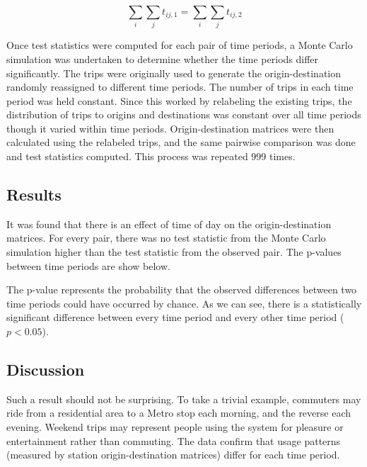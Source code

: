 \documentclass[letterpaper,11pt]{article}
\begin{document}
\begin{equation}\label{eq:timeconstraint}
  \displaystyle \sum_i \sum_j t_{ij,1} = \sum_i \sum_j t_{ij,2}
\end{equation}

Once test statistics were computed for each pair of time periods, a
Monte Carlo simulation was undertaken to determine whether the time
periods differ significantly. The trips were originally used to
generate the origin-destination randomly reassigned to different time
periods. The number of trips in each time period was held
constant. Since this worked by relabeling the existing trips, the
distribution of trips to origins and destinations was constant over
all time periods though it varied within time
periods. Origin-destination matrices were then calculated using the
relabeled trips, and the same pairwise comparison was done and test
statistics computed. This process was repeated 999 times.

\subsection{Results}

It was found that there is an effect of time of day on the
origin-destination matrices. For every pair, there was no test
statistic from the Monte Carlo simulation higher than the test statistic
from the observed pair. The p-values between time periods are show below.

\noindent 

The p-value represents the probability that the observed differences
between two time periods could have occurred by chance. As we can see,
there is a statistically significant difference between every time
period and every other time period ($p < 0.05$).

\subsection{Discussion}

Such a result should not be surprising. To take a trivial example,
commuters may ride from a residential area to a Metro stop each
morning, and the reverse each evening. Weekend trips may represent
people using the system for pleasure or entertainment rather than
commuting. The data confirm that usage patterns (measured by station
origin-destination matrices) differ for each time period.
\end{document}
